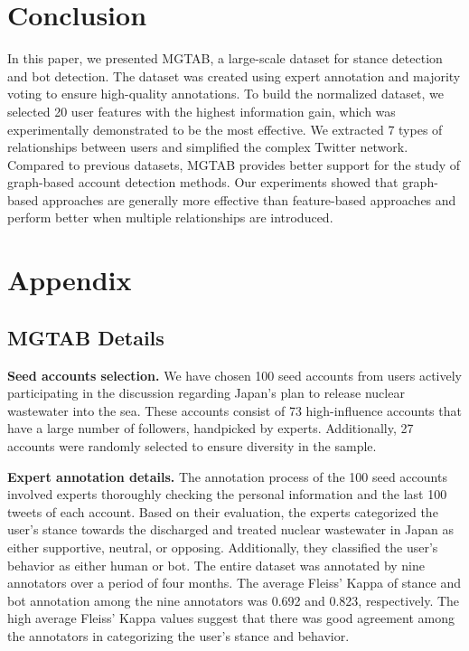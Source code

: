 \documentclass[10pt,twocolumn,letterpaper]{article}
\begin{document}
\section{Conclusion}
In this paper, we presented MGTAB, a large-scale dataset for stance detection and bot detection. The dataset was created using expert annotation and majority voting to ensure high-quality annotations. To build the normalized dataset, we selected 20 user features with the highest information gain, which was experimentally demonstrated to be the most effective. We extracted 7 types of relationships between users and simplified the complex Twitter network. Compared to previous datasets, MGTAB provides better support for the study of graph-based account detection methods. Our experiments showed that graph-based approaches are generally more effective than feature-based approaches and perform better when multiple relationships are introduced.


{\small


}

\clearpage


\appendix
\renewcommand\thetable{\Alph{section}\arabic{table}}
\section{Appendix}
\setcounter{table}{0}
\subsection{MGTAB Details}
\label{sec:MGTABDetails}
\noindent
\textbf{Seed accounts selection.}
We have chosen 100 seed accounts from users actively participating in the discussion regarding Japan's plan to release nuclear wastewater into the sea. These accounts consist of 73 high-influence accounts that have a large number of followers, handpicked by experts. Additionally, 27 accounts were randomly selected to ensure diversity in the sample.

\noindent
\textbf{Expert annotation details.}
The annotation process of the 100 seed accounts involved experts thoroughly checking the personal information and the last 100 tweets of each account. Based on their evaluation, the experts categorized the user's stance towards the discharged and treated nuclear wastewater in Japan as either supportive, neutral, or opposing. Additionally, they classified the user's behavior as either human or bot. The entire dataset was annotated by nine annotators over a period of four months. The average Fleiss' Kappa of stance and bot annotation among the nine annotators was 0.692 and 0.823, respectively. The high average Fleiss' Kappa values suggest that there was good agreement among the annotators in categorizing the user's stance and behavior.
\end{document}
